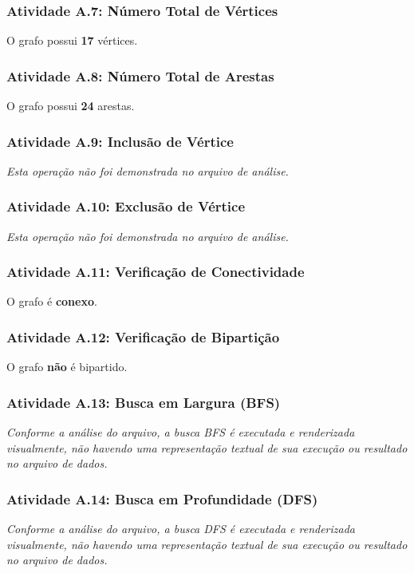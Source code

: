 \documentclass[a4paper,12pt]{article}
\begin{document}
\subsubsection*{Atividade A.7: Número Total de Vértices}
O grafo possui \textbf{17} vértices.

\subsubsection*{Atividade A.8: Número Total de Arestas}
O grafo possui \textbf{24} arestas.

\subsubsection*{Atividade A.9: Inclusão de Vértice}
\textit{Esta operação não foi demonstrada no arquivo de análise.}

\subsubsection*{Atividade A.10: Exclusão de Vértice}
\textit{Esta operação não foi demonstrada no arquivo de análise.}

\subsubsection*{Atividade A.11: Verificação de Conectividade}
O grafo é \textbf{conexo}.

\subsubsection*{Atividade A.12: Verificação de Bipartição}
O grafo \textbf{não} é bipartido.

\subsubsection*{Atividade A.13: Busca em Largura (BFS)}
\textit{Conforme a análise do arquivo, a busca BFS é executada e renderizada visualmente, não havendo uma representação textual de sua execução ou resultado no arquivo de dados.}

\subsubsection*{Atividade A.14: Busca em Profundidade (DFS)}
\textit{Conforme a análise do arquivo, a busca DFS é executada e renderizada visualmente, não havendo uma representação textual de sua execução ou resultado no arquivo de dados.}
\end{document}
